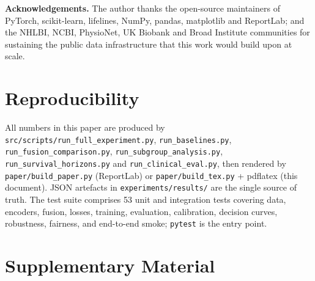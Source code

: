 \documentclass[11pt,a4paper]{article}
\begin{document}
\noindent\textbf{Acknowledgements.} The author thanks the open-source maintainers of PyTorch, scikit-learn, lifelines, NumPy, pandas, matplotlib and ReportLab; and the NHLBI, NCBI, PhysioNet, UK Biobank and Broad Institute communities for sustaining the public data infrastructure that this work would build upon at scale.
\linenumbers
\FloatBarrier
\section{Reproducibility}
All numbers in this paper are produced by \texttt{src/scripts/run\_full\_experiment.py}, \texttt{run\_baselines.py}, \texttt{run\_fusion\_comparison.py}, \texttt{run\_subgroup\_analysis.py}, \texttt{run\_survival\_horizons.py} and \texttt{run\_clinical\_eval.py}, then rendered by \texttt{paper/build\_paper.py} (ReportLab) or \texttt{paper/build\_tex.py} + pdflatex (this document). JSON artefacts in \texttt{experiments/results/} are the single source of truth. The test suite comprises 53 unit and integration tests covering data, encoders, fusion, losses, training, evaluation, calibration, decision curves, robustness, fairness, and end-to-end smoke; \texttt{pytest} is the entry point.


\clearpage
\appendix
\section*{Supplementary Material}
\renewcommand{\thetable}{S\arabic{table}}
\renewcommand{\thefigure}{S\arabic{figure}}
\setcounter{table}{0}\setcounter{figure}{0}
\end{document}
